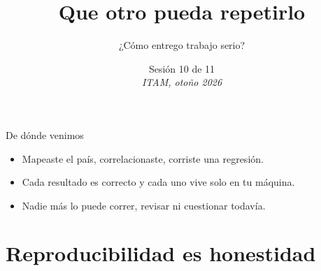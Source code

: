 %



\title[Lab de R · Sesión 10]{Que otro pueda repetirlo}
\subtitle{¿Cómo entrego trabajo serio?}
\date{%
  Sesión 10 de 11\\[0.3em]
  \textit{ITAM, otoño 2026}%
}



{
\begin{frame}
  \titlepage
\end{frame}}


\begin{frame}{De dónde venimos}
  \vspace{0.3em}
  \begin{itemize}\setlength{\itemsep}{0.9em}
    \item<1-> Mapeaste el país, correlacionaste, corriste una regresión.
    \item<2-> Cada resultado es correcto y cada uno vive solo en tu máquina.
    \item<3-> Nadie más lo puede correr, revisar ni cuestionar todavía.
  \end{itemize}
\end{frame}

\section{Reproducibilidad es honestidad}

